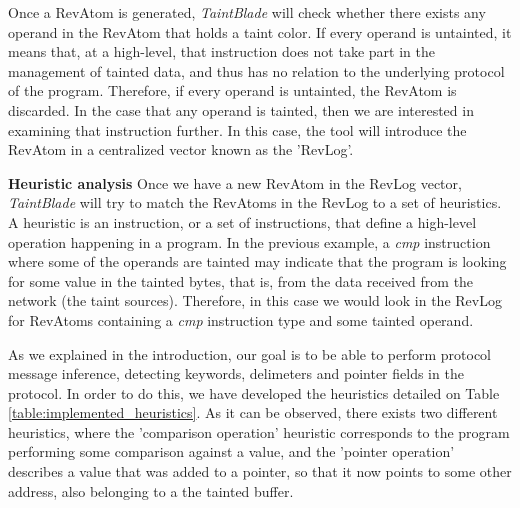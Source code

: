 \documentclass[conference]{IEEEtran}
\begin{document}
Once a RevAtom is generated, \textit{TaintBlade} will check whether there
exists any operand in the RevAtom that holds a taint color. If every operand is
untainted, it means that, at a high-level, that instruction does not take part
in the management of tainted data, and thus has no relation to the underlying
protocol of the program. Therefore, if every operand is untainted, the RevAtom
is discarded. In the case that any operand is tainted, then we are interested
in examining that instruction further. In this case, the tool will introduce
the RevAtom in a centralized vector known as the 'RevLog'.

\textbf{Heuristic analysis}
Once we have a new RevAtom in the RevLog vector, \textit{TaintBlade} will try to match the RevAtoms in the RevLog
to a set of heuristics. A heuristic is an instruction, or a set of instructions, that define a high-level
operation happening in a program. In the previous example, a \textit{cmp} instruction where some of the operands
are tainted may indicate that the program is looking for some value in the tainted bytes, that is, from the data
received from the network (the taint sources). Therefore, in this case we would look in the RevLog for RevAtoms
containing a \textit{cmp} instruction type and some tainted operand.

As we explained in the introduction, our goal is to be able to perform protocol
message inference, detecting keywords, delimeters and pointer fields in the
protocol. In order to do this, we have developed the heuristics detailed on
Table \ref{table:implemented_heuristics}. As it can be observed, there exists
two different heuristics, where the 'comparison operation' heuristic
corresponds to the program performing some comparison against a value, and the
'pointer operation' describes a value that was added to a pointer, so that it
now points to some other address, also belonging to a the tainted buffer.
\end{document}
